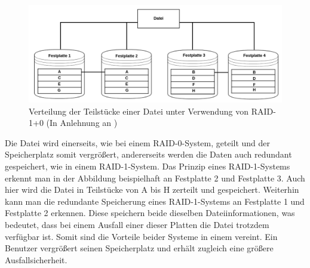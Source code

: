 \begin{figure}[H]
  \centering
  \includegraphics[scale=0.3]{resources/Bilder_Kapitel_2/RAID-10.png}
  \caption[Verteilung der Teilstücke einer Datei unter Verwendung von RAID-1+0]{Verteilung der Teilstücke einer Datei unter Verwendung von RAID-1+0 (In Anlehnung an \cite[Seite 281]{mandl08})}
  \label{fig-raid-10}
\end{figure}

Die Datei wird einerseits, wie bei einem \ac{RAID}-0-System, geteilt und der Speicherplatz somit vergrößert, andererseits werden die Daten auch redundant gespeichert, wie in einem \ac{RAID}-1-System.
Das Prinzip eines \ac{RAID}-1-Systems erkennt man in der Abbildung beispielhaft an Festplatte 2 und Festplatte 3.
Auch hier wird die Datei in Teilstücke von A bis H zerteilt und gespeichert.
Weiterhin kann man die redundante Speicherung eines \ac{RAID}-1-Systems an Festplatte 1 und Festplatte 2 erkennen.
Diese speichern beide dieselben Dateiinformationen, was bedeutet, dass bei einem Ausfall einer dieser Platten die Datei trotzdem verfügbar ist.
Somit sind die Vorteile beider Systeme in einem vereint.
Ein Benutzer vergrößert seinen Speicherplatz und erhält zugleich eine größere Ausfallsicherheit.
%
%
